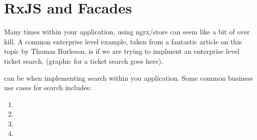 \chapter{ RxJS and Facades }
Many times within your application, using ngrx/store can seem like a bit of over kill. A common enterprise level example, taken from a fantastic article on this topic by Thomas Burleson, is if we are trying to implment an enterprise level ticket search. (graphic for a ticket search goes here).

can be when implementing search within you application. Some common business use cases for search includes: 
\begin{enumerate}
  \item 
  \item
  \item
  \item
\end{enumerate}